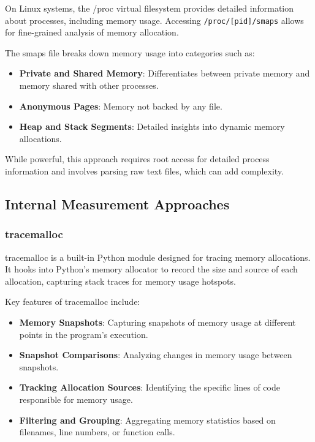 On Linux systems, the /proc virtual filesystem provides detailed information about processes, including memory usage.
Accessing \texttt{/proc/[pid]/smaps} allows for fine-grained analysis of memory allocation.

The smaps file breaks down memory usage into categories such as:

\begin{itemize}
    \item \textbf{Private and Shared Memory}:
    Differentiates between private memory and memory shared with other processes.

    \item \textbf{Anonymous Pages}:
    Memory not backed by any file.

    \item \textbf{Heap and Stack Segments}:
    Detailed insights into dynamic memory allocations.
\end{itemize}

While powerful, this approach requires root access for detailed process information and involves parsing raw text files, which can add complexity.

\subsection{Internal Measurement Approaches}
\label{subsec:mmc-internal-measurement-approaches}

\subsubsection{tracemalloc}

tracemalloc is a built-in Python module designed for tracing memory allocations.
It hooks into Python's memory allocator to record the size and source of each allocation, capturing stack traces for memory usage hotspots.

Key features of tracemalloc include:

\begin{itemize}
    \item \textbf{Memory Snapshots}:
    Capturing snapshots of memory usage at different points in the program's execution.

    \item \textbf{Snapshot Comparisons}:
    Analyzing changes in memory usage between snapshots.

    \item \textbf{Tracking Allocation Sources}:
    Identifying the specific lines of code responsible for memory usage.

    \item \textbf{Filtering and Grouping}:
    Aggregating memory statistics based on filenames, line numbers, or function calls.
\end{itemize}

